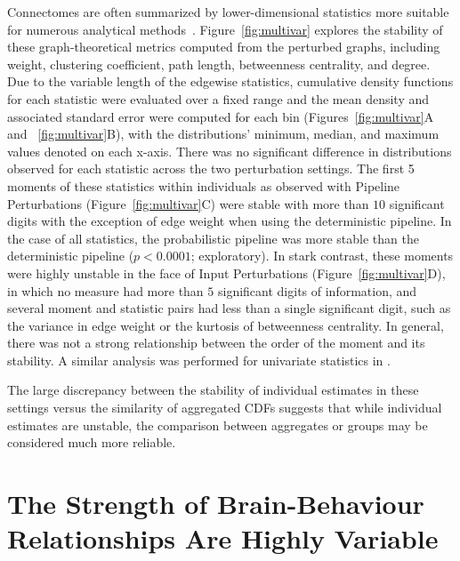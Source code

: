 \documentclass[fleqn,10pt]{SelfArx} %
\begin{document}
Connectomes are often summarized by lower-dimensional statistics more suitable for numerous analytical
methods~\cite{Rubinov2010-fh}. Figure~\ref{fig:multivar} explores the stability of these graph-theoretical metrics
computed from the perturbed graphs, including weight, clustering coefficient, path length, betweenness centrality, and
degree. Due to the variable length of the edgewise statistics, cumulative density functions for each statistic were
evaluated over a fixed range and the mean density and associated standard error were computed for each bin
(Figures~\ref{fig:multivar}A and ~\ref{fig:multivar}B), with the distributions' minimum, median, and maximum values
denoted on each x-axis. There was no significant difference in distributions observed for each statistic across the two
perturbation settings. The first 5 moments of these statistics within individuals as observed with Pipeline
Perturbations (Figure~\ref{fig:multivar}C) were stable with more than $10$ significant digits with the exception of
edge weight when using the deterministic pipeline. In the case of all statistics, the probabilistic pipeline was more
stable than the deterministic pipeline ($p < 0.0001$; exploratory). In stark contrast, these moments were highly
unstable in the face of Input Perturbations (Figure~\ref{fig:multivar}D), in which no measure had more than $5$
significant digits of information, and several moment and statistic pairs had less than a single significant digit,
such as the variance in edge weight or the kurtosis of betweenness centrality. In general, there was not a strong
relationship between the order of the moment and its stability. A similar analysis was performed for univariate
statistics in .

The large discrepancy between the stability of individual estimates in these settings versus the similarity of
aggregated CDFs suggests that while individual estimates are unstable, the comparison between aggregates or groups may
be considered much more reliable.

\section*{The Strength of Brain-Behaviour Relationships Are Highly Variable}
\end{document}
